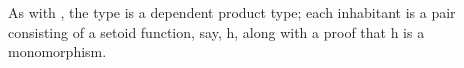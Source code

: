 \begin{code}%
\>[0]\<%
\\
\>[0][@{}l@{\AgdaIndent{1}}]%
\>[1]\AgdaSpace{}%
\AgdaSpace{}%
\AgdaSymbol{(}\AgdaSpace{}%
\AgdaSymbol{:}\AgdaSpace{}%
\AgdaOperator{\AgdaFunction{𝔻[}}\AgdaSpace{}%
\AgdaSpace{}%
\AgdaOperator{\AgdaFunction{]}}\AgdaSpace{}%
\AgdaSpace{}%
\AgdaOperator{\AgdaFunction{𝔻[}}\AgdaSpace{}%
\AgdaSpace{}%
\AgdaOperator{\AgdaFunction{]}}\AgdaSymbol{)}\AgdaSpace{}%
\AgdaSymbol{:}\AgdaSpace{}%
\AgdaSpace{}%
\AgdaSymbol{(}\AgdaSpace{}%
\AgdaSpace{}%
\AgdaSpace{}%
\AgdaSpace{}%
\AgdaSpace{}%
\AgdaSpace{}%
\AgdaSpace{}%
\AgdaSpace{}%
\AgdaSymbol{)}\AgdaSpace{}%
\<%
\\
\>[1][@{}l@{\AgdaIndent{0}}]%
\>[2]%
\>[9]\AgdaSpace{}%
\AgdaSymbol{:}\AgdaSpace{}%
\AgdaSpace{}%
\<%
\\
%
\>[9]\AgdaSpace{}%
\AgdaSymbol{:}\AgdaSpace{}%
\AgdaSpace{}%
\<%
\\
%
\\[\AgdaEmptyExtraSkip]%
%
\>[2]\AgdaSpace{}%
\AgdaSymbol{:}\AgdaSpace{}%
\<%
\\
%
\>[2]\AgdaSpace{}%
\AgdaSymbol{=}\AgdaSpace{}%
\AgdaSpace{}%
\AgdaOperator{\AgdaInductiveConstructor{,}}\AgdaSpace{}%
\<%
\\
%
\\[\AgdaEmptyExtraSkip]%
%
\>[1]\AgdaSpace{}%
\AgdaSymbol{:}\AgdaSpace{}%
\AgdaSpace{}%
\AgdaSymbol{\AgdaUnderscore{}}\<%
\\
%
\>[1]\AgdaSpace{}%
\AgdaSymbol{=}\AgdaSpace{}%
\AgdaSpace{}%
\AgdaSymbol{(}\AgdaOperator{\AgdaFunction{𝔻[}}\AgdaSpace{}%
\AgdaSpace{}%
\AgdaOperator{\AgdaFunction{]}}\AgdaSpace{}%
\AgdaSpace{}%
\AgdaOperator{\AgdaFunction{𝔻[}}\AgdaSpace{}%
\AgdaSpace{}%
\AgdaOperator{\AgdaFunction{]}}\AgdaSymbol{)}\AgdaSpace{}%
\<%
\\
\>[0]\<%
\end{code}
As with , the type  is a dependent product type; each inhabitant is a pair consisting of a setoid function, say, \ab h, along with a proof that \ab h is a monomorphism.

